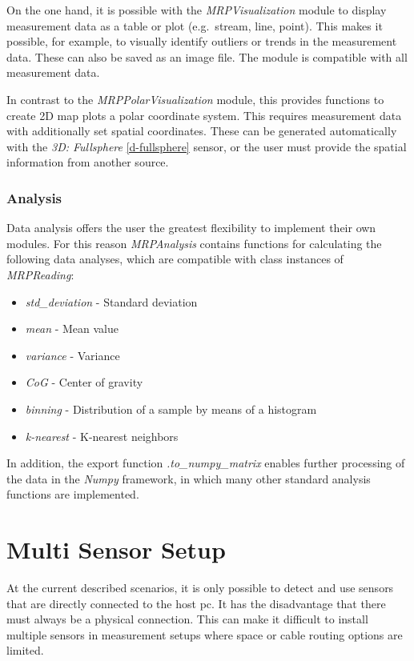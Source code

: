 On the one hand, it is possible with the \emph{MRPVisualization} module
to display measurement data as a table or plot (e.g.~stream, line,
point). This makes it possible, for example, to visually identify
outliers or trends in the measurement data. These can also be saved as
an image file. The module is compatible with all measurement data.

In contrast to the \emph{MRPPolarVisualization} module, this provides
functions to create 2D map plots a polar coordinate system. This
requires measurement data with additionally set spatial coordinates.
These can be generated automatically with the \emph{3D: Fullsphere}
\ref{d-fullsphere} sensor, or the user must provide the spatial
information from another source.

\hypertarget{analysis}{%
\subsubsection{Analysis}\label{analysis}}

Data analysis offers the user the greatest flexibility to implement
their own modules. For this reason \emph{MRPAnalysis} contains functions
for calculating the following data analyses, which are compatible with
class instances of \emph{MRPReading}:

\begin{itemize}
\tightlist
\item
  \emph{std\_deviation} - Standard deviation
\item
  \emph{mean} - Mean value
\item
  \emph{variance} - Variance
\item
  \emph{CoG} - Center of gravity
\item
  \emph{binning} - Distribution of a sample by means of a histogram
\item
  \emph{k-nearest} - K-nearest neighbors
\end{itemize}

In addition, the export function \emph{.to\_numpy\_matrix} enables
further processing of the data in the \emph{Numpy}
\cite{harris2020array} framework, in which many other standard
analysis functions are implemented.

\hypertarget{multi-sensor-setup}{%
\section{Multi Sensor Setup}\label{multi-sensor-setup}}

At the current described scenarios, it is only possible to detect and
use sensors that are directly connected to the host \gls{pc}. It has the
disadvantage that there must always be a physical connection. This can
make it difficult to install multiple sensors in measurement setups
where space or cable routing options are limited.

